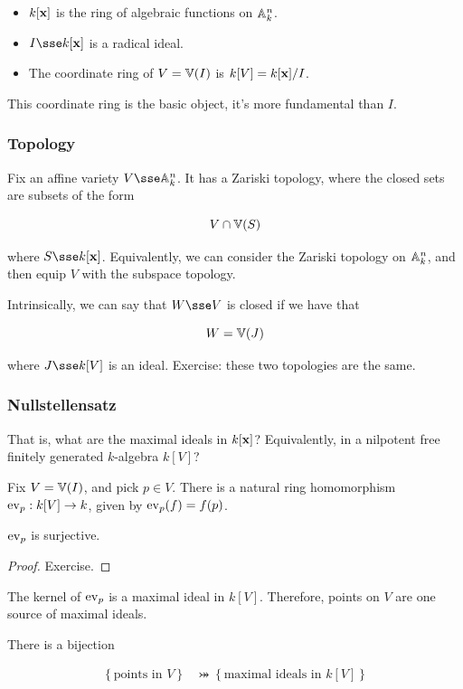 \documentclass{article}
\begin{document}
\begin{itemize}
    \item \(k[\mathbf{x}]\) is the ring of algebraic functions on \(\mathbb{A}_{k}^{n}\).
    \item \(I \sse k\polys\) is a radical ideal.
    \item The coordinate ring of \(V = \mathbb{V}(I)\) is \(k[V] = k[\mathbf{x}]/I\).
\end{itemize}

This coordinate ring is the basic object, it's more fundamental than \(I\).

\subsubsection{Topology}

Fix an affine variety \(V \sse \aff k n\). It has a Zariski topology, where the closed sets are subsets of the form

\[V \cap \mathbb{V}(S)\]

where \(S \sse k\polys\). Equivalently, we can consider the Zariski topology on \(\mathbb{A}_{k}^{n}\), and then equip \(V\) with the subspace topology.

Intrinsically, we can say that \(W \sse V\) is closed if we have that

\[W = \mathbb{V}(J)\]

where \(J \sse k[V]\) is an ideal. Exercise: these two topologies are the same.

\subsubsection{Nullstellensatz}

That is, what are the maximal ideals in \(k[\mathbf{x}]\)? Equivalently, in a nilpotent free finitely generated \(k\)-algebra \(k[V]\)?

Fix \(V = \mathbb{V}(I)\), and pick \(p \in V\). There is a natural ring homomorphism \(\mathrm{ev}_p : k[V] \to k\), given by \(\mathrm{ev}_p(f) = f(p)\).

\begin{claim}
    \(\mathrm{ev}_p\) is surjective.
\end{claim}

\begin{proof}
    Exercise.
\end{proof}

The kernel of \(\mathrm{ev}_p\) is a maximal ideal in \(k[V]\). Therefore, points on \(V\) are one source of maximal ideals.

\begin{theorem}
    [Nullstellensatz] There is a bijection
    
    \begin{align*}
        \left\{\text{points in }V\right\} &\bij \left\{\text{maximal ideals in }k[V]\right\}
    \end{align*}
\end{theorem}
\end{document}
